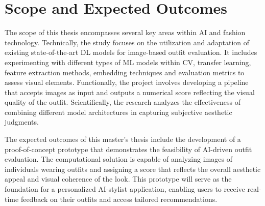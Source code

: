 \section{Scope and Expected Outcomes}

The scope of this thesis encompasses several key areas within \acs{AI} and fashion technology. Technically, the study focuses on the utilization and adaptation of existing state-of-the-art \acs{DL} models for image-based outfit evaluation. It includes experimenting with different types of \acs{ML} models within \acs{CV}, transfer learning, feature extraction methods, embedding techniques and evaluation metrics to assess visual elements. Functionally, the project involves developing a pipeline that accepts images as input and outputs a numerical score reflecting the visual quality of the outfit. Scientifically, the research analyzes the effectiveness of combining different model architectures in capturing subjective aesthetic judgments.

The expected outcomes of this master's thesis include the development of a proof-of-concept prototype that demonstrates the feasibility of \acs{AI}-driven outfit evaluation. The computational solution is capable of analyzing images of individuals wearing outfits and assigning a score that reflects the overall aesthetic appeal and visual coherence of the look. This prototype will serve as the foundation for a personalized \acs{AI}-stylist application, enabling users to receive real-time feedback on their outfits and access tailored recommendations.